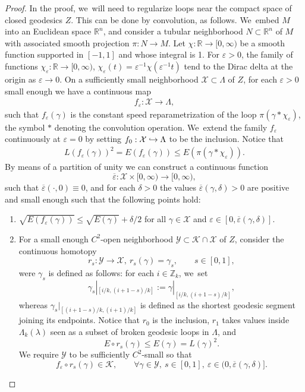 \documentclass[JEP,XML,SOM,Unicode,NoFloatCountersInSection,published]{cedram}
\let\epsilon\varepsilon
\newcommand\hto{\mathrel{\lhook\joinrel\to}}
\newcommand{\Z}{\mathbb{Z}}
\newcommand{\R}{\mathbb{R}}
\newcommand{\KK}{\mathcal{K}}
\newcommand{\XX}{\mathcal{X}}
\newcommand{\YY}{\mathcal{Y}}
\theoremstyle{plain}
\theoremstyle{definition}
\begin{document}
\begin{proof}
In the proof, we~will need to regularize loops near the compact space of closed geodesics $Z$. This can be done by convolution, as follows. We~embed $M$ into an Euclidean space $\R^n$, and consider a tubular neighborhood $N\subset\R^n$ of $M$ with associated smooth projection $\pi:N\to M$. Let $\chi:\R\to[0,\infty)$ be a smooth function supported in $[-1,1]$ and whose integral is 1. For $\epsilon>0$, the family of functions
\hbox{$\chi_\epsilon:\R\to[0,\infty)$}, $\chi_\epsilon(t)=\epsilon^{-1}\chi(\epsilon^{-1}t)$
tend to the Dirac delta at the origin as $\epsilon\to0$. On a sufficiently small neighborhood $\XX\subset\Lambda$ of $Z$, for each $\epsilon>0$ small enough we have a continuous map
\begin{align*}
f_\epsilon:\XX \to \Lambda,
\end{align*}
such that $f_\epsilon(\gamma)$ is the constant speed reparametrization of the loop $\pi(\gamma*\chi_\epsilon)$, the symbol $*$ denoting the convolution operation. We~extend the family $f_\epsilon$ continuously at $\epsilon=0$ by setting $f_0:\XX \hto \Lambda$ to be the inclusion.
Notice that
\begin{align*}
L(f_\epsilon(\gamma))^2
=
E(f_\epsilon(\gamma))
\leq
E(\pi(\gamma*\chi_\epsilon)).
\end{align*}
By means of a partition of unity we can construct a continuous function
\[
\overline\epsilon:\XX\times[0,\infty)\to[0,\infty),
\]
such that $\overline\epsilon(\cdot,0)\equiv0$, and for each $\delta>0$ the values $\overline\epsilon(\gamma,\delta)>0$ are positive and small enough such that the following points hold:
\begin{enumerate}
\item\label{l:finitely_generatedi}
$\sqrt{E(f_\epsilon(\gamma))}\leq \sqrt{E(\gamma)}+\delta/2$ for all $\gamma\in\XX$ and $\epsilon\in[0,\overline\epsilon(\gamma,\delta)]$.

\item\label{l:finitely_generatedii}
For a small enough $C^2$-open neighborhood $\YY\subset\KK\cap\XX$ of $Z$,
consider the continuous homotopy
\[
r_s:\YY\to\XX,\ r_s(\gamma)=\gamma_s,\qquad s\in[0,1],
\]
were $\gamma_s$ is defined as follows: for each $i\in\Z_k$, we~set
\[
\gamma_s|_{[i/k,(i+1-s)/k]}:=\gamma|_{[i/k,(i+1-s)/k]},
\]
whereas $\gamma_s|_{[(i+1-s)/k,(i+1)/k]}$ is defined as the shortest geodesic segment joining its endpoints. Notice that $r_0$ is the inclusion, $r_1$ takes values inside $\Lambda_k(\lambda)$ seen as a subset of broken geodesic loops in $\Lambda$, and
\[
E\circ r_s(\gamma)\leq E(\gamma)= L(\gamma)^2.
\]
We require $\YY$ to be sufficiently $C^2$-small so that
\[
f_\epsilon\circ r_s(\gamma)\in\KK,\qquad\forall \gamma\in\YY,\ s\in[0,1],\ \epsilon\in(0,\overline\epsilon(\gamma,\delta)].
\]


\end{enumerate}
\end{proof}
\end{document}
